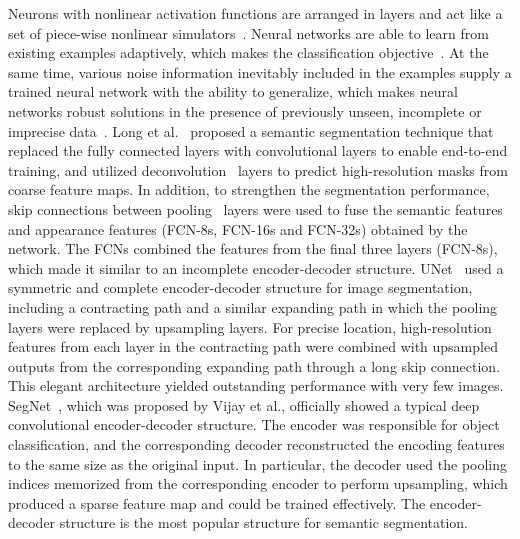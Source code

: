 \documentclass[10pt,twocolumn,letterpaper]{article}
\begin{document}
Neurons with nonlinear activation functions are arranged in layers and act like a set of piece-wise nonlinear simulators~\cite{neurApproximators}. Neural networks are able to learn from existing examples adaptively, which makes the classification objective~\cite{classificationObjective}. At the same time, various noise information inevitably included in the examples supply a trained neural network with the ability to generalize, which makes neural networks robust solutions in the presence of previously unseen, incomplete or imprecise data~\cite{impreciseData}.
 Long et al.~\cite{long} proposed a semantic segmentation technique that replaced the fully connected layers with convolutional layers to enable end-to-end training, and utilized deconvolution~\cite{deconvolutional} layers to predict high-resolution masks from coarse feature maps. In addition, to strengthen the segmentation performance, skip connections between pooling~\cite{gradientBased} layers were used to fuse the semantic features and appearance features (FCN-8s, FCN-16s and FCN-32s) obtained by the network. The FCNs combined the features from the final three layers (FCN-8s), which made it similar to an incomplete encoder-decoder structure. UNet~\cite{unet} used a symmetric and complete encoder-decoder structure for image segmentation, including a contracting path and a similar expanding path in which the pooling layers were replaced by upsampling layers. For precise location, high-resolution features from each layer in the contracting path were combined with upsampled outputs from the corresponding expanding path through a long skip connection. This elegant architecture yielded outstanding performance with very few images. SegNet~\cite{segnet}, which was proposed by Vijay et al., officially showed a typical deep convolutional encoder-decoder structure. The encoder was responsible for object classification, and the corresponding decoder reconstructed the encoding features to the same size as the original input. In particular, the decoder used the pooling indices memorized from the corresponding encoder to perform upsampling, which produced a sparse feature map and could be trained effectively. The encoder-decoder structure is the most popular structure for semantic segmentation.
 
\end{document}
